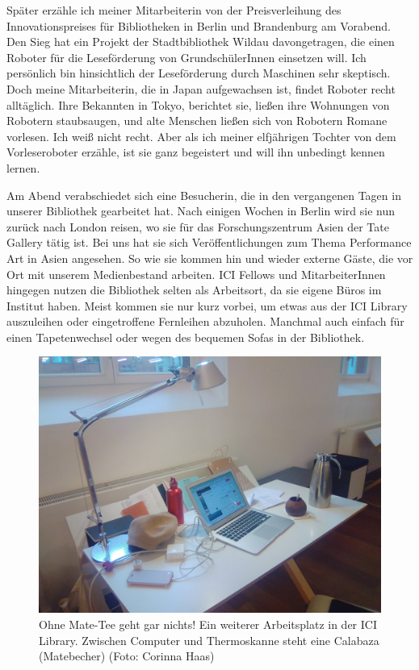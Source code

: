 \documentclass[a4paper,
fontsize=11pt,
oneside,
numbers=noperiodatend,
parskip=half-,
bibliography=totoc,
final
]{scrartcl}
\begin{document}
Später erzähle ich meiner Mitarbeiterin von der Preisverleihung des
Innovationspreises für Bibliotheken in Berlin und Brandenburg am
Vorabend. Den Sieg hat ein Projekt der Stadtbibliothek Wildau
davongetragen, die einen Roboter für die Leseförderung von
GrundschülerInnen einsetzen will. Ich persönlich bin hinsichtlich der
Leseförderung durch Maschinen sehr skeptisch. Doch meine Mitarbeiterin,
die in Japan aufgewachsen ist, findet Roboter recht alltäglich. Ihre
Bekannten in Tokyo, berichtet sie, ließen ihre Wohnungen von Robotern
staubsaugen, und alte Menschen ließen sich von Robotern Romane vorlesen.
Ich weiß nicht recht. Aber als ich meiner elfjährigen Tochter von dem
Vorleseroboter erzähle, ist sie ganz begeistert und will ihn unbedingt
kennen lernen.

Am Abend verabschiedet sich eine Besucherin, die in den vergangenen
Tagen in unserer Bibliothek gearbeitet hat. Nach einigen Wochen in
Berlin wird sie nun zurück nach London reisen, wo sie für das
Forschungszentrum Asien der Tate Gallery tätig ist. Bei uns hat sie sich
Veröffentlichungen zum Thema Performance Art in Asien angesehen. So wie
sie kommen hin und wieder externe Gäste, die vor Ort mit unserem
Medienbestand arbeiten. ICI Fellows und MitarbeiterInnen hingegen nutzen
die Bibliothek selten als Arbeitsort, da sie eigene Büros im Institut
haben. Meist kommen sie nur kurz vorbei, um etwas aus der ICI Library
auszuleihen oder eingetroffene Fernleihen abzuholen. Manchmal auch
einfach für einen Tapetenwechsel oder wegen des bequemen Sofas in der
Bibliothek.

\begin{figure}
\centering
\includegraphics{img/Haas_3.jpg}
\caption{Ohne Mate-Tee geht gar nichts! Ein weiterer Arbeitsplatz in der
ICI Library. Zwischen Computer und Thermoskanne steht eine Calabaza
(Matebecher) (Foto: Corinna Haas)}
\end{figure}
\end{document}
